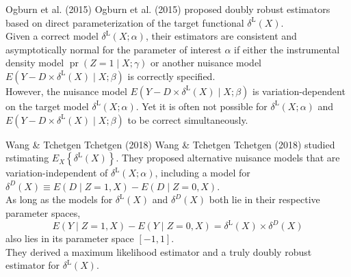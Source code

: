 \documentclass[aspectratio=169,xcolor=dvipsnames]{beamer}
\begin{document}
\begin{frame}{Ogburn et al. (2015)}
Ogburn et al. (2015) proposed doubly robust estimators based on direct parameterization of the target functional $\delta^{\mathrm{L}}(X)$.\vspace{8pt}\\
Given a correct model $\delta^{\mathrm{L}}(X ; \alpha)$, their estimators are consistent and asymptotically normal for the parameter of interest $\alpha$ if either the instrumental density model $\operatorname{pr}(Z=1 \mid X ; \gamma)$ or another nuisance model $E\left(Y-D \times \delta^{\mathrm{L}}(X) \mid X ; \beta\right)$ is correctly specified.\vspace{8pt}\\
However, the nuisance model $E\left(Y-D \times \delta^{\mathrm{L}}(X) \mid X ; \beta\right)$ is variation-dependent on the target model $\delta^{\mathrm{L}}(X ; \alpha)$. Yet it is often not possible for $\delta^{\mathrm{L}}(X ; \alpha)$ and $E\left(Y-D \times \delta^{\mathrm{L}}(X) \mid X ; \beta\right)$ to be correct simultaneously.
\end{frame}

\begin{frame}{Wang \& Tchetgen Tchetgen (2018)}
Wang \& Tchetgen Tchetgen (2018) studied rstimating $E_{X}\left\{\delta^{\mathrm{L}}(X)\right\}$. They proposed alternative nuisance models that are variation-independent of $\delta^{\mathrm{L}}(X ; \alpha)$, including a model for $\delta^{D}(X) \equiv E(D \mid Z=1, X)-E(D \mid Z=0, X)$. \vspace{8pt}\\
As long as the models for $\delta^{\mathrm{L}}(X)$ and $\delta^{D}(X)$ both lie in their respective parameter spaces,
$$
E(Y \mid Z=1, X)-E(Y \mid Z=0, X)=\delta^{\mathrm{L}}(X) \times \delta^{D}(X)
$$
also lies in its parameter space $[-1,1]$. \vspace{8pt}\\
They derived a maximum likelihood estimator and a truly doubly robust estimator for $\delta^{\mathrm{L}}(X)$.
\end{frame}

\end{document}

